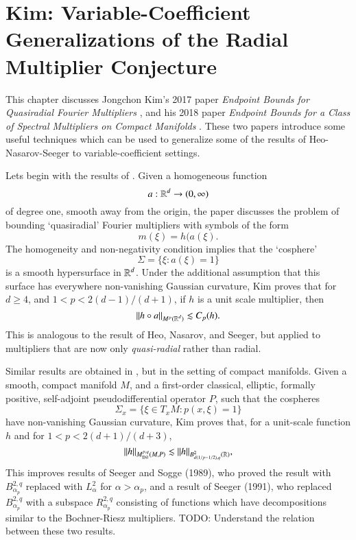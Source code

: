 \chapter[Kim: Variable Coefficient Generalizations of the RMC]{Kim: Variable-Coefficient Generalizations of the Radial Multiplier Conjecture}

This chapter discusses Jongchon Kim's 2017 paper \emph{Endpoint Bounds for Quasiradial Fourier Multipliers} \cite{KimQuasiradial}, and his 2018 paper \emph{Endpoint Bounds for a Class of Spectral Multipliers on Compact Manifolds} \cite{KimSpectral}. These two papers introduce some useful techniques which can be used to generalize some of the results of Heo-Nasarov-Seeger to variable-coefficient settings.

Lets begin with the results of \cite{KimQuasiradial}. Given a homogeneous function
%
\[ a: \operatorname{\mathbb{R}}^d \to (0,\infty) \]
%
of degree one, smooth away from the origin, the paper discusses the problem of bounding `quasiradial' Fourier multipliers with symbols of the form
%
\[ m(\xi) = h(a(\xi). \]
%
The homogeneity and non-negativity condition implies that the `cosphere'
%
\[ \Sigma = \{ \xi : a(\xi) = 1 \} \]
%
is a smooth hypersurface in $\operatorname{\mathbb{R}}^d$. Under the additional assumption that this surface has everywhere non-vanishing Gaussian curvature, Kim proves that for $d \geq 4$, and $1 < p < 2(d-1)/(d+1)$, if $h$ is a unit scale multiplier, then
%
\[ \| h \circ a \|_{M^p(\operatorname{\mathbb{R}}^d)} \lesssim C_p(h). \]
%
This is analogous to the result of Heo, Nasarov, and Seeger, but applied to multipliers that are now only \emph{quasi-radial} rather than radial.

Similar results are obtained in \cite{KimSpectral}, but in the setting of compact manifolds. Given a smooth, compact manifold $M$, and a first-order classical, elliptic, formally positive, self-adjoint pseudodifferential operator $P$, such that the cospheres
%
\[ \Sigma_x = \{ \xi \in T_x M : p(x,\xi) = 1 \} \]
%
have non-vanishing Gaussian curvature, Kim proves that, for a unit-scale function $h$ and for $1 < p < 2(d+1)/(d+3)$,
%
\[ \| h \|_{M^{p,q}_{\text{Dil}}(M,P)} \lesssim \| h \|_{B^2_{d(1/p - 1/2),q}(\operatorname{\mathbb{R}})}, \]
%
This improves results of Seeger and Sogge (1989), who proved the result with $B^{2,q}_{\alpha_p}$ replaced with $L^2_\alpha$ for $\alpha > \alpha_p$, and a result of Seeger (1991), who replaced $B^{2,q}_{\alpha_p}$ with a subspace $R^{2,q}_{\alpha_p}$ consisting of functions which have decompositions similar to the Bochner-Riesz multipliers. TODO: Understand the relation between these two results.

